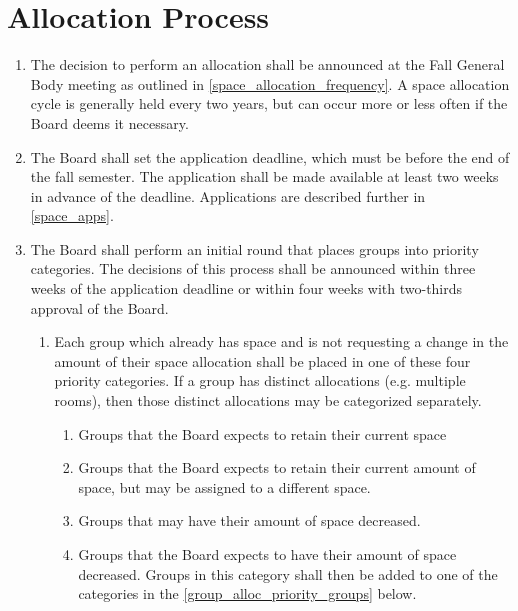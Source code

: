 \documentclass[12pt]{constitution}
\begin{document}
\section{Allocation Process}
\label{space_apps_process}

\begin{enumerate}
    \item The decision to perform an allocation shall be announced at the Fall General Body meeting
        as outlined in \ref{space_allocation_frequency}.
    A space allocation cycle is generally held every two years, but can occur more or less often if
        the Board deems it necessary.
    
    \item The Board shall set the application deadline, which must be before the end of the fall semester.
    The application shall be made available at least two weeks in advance of the deadline.
    Applications are described further in \ref{space_apps}.

    \item The Board shall perform an initial round that places groups into priority categories.
    The decisions of this process shall be announced within three weeks of the application deadline or
        within four weeks with two-thirds approval of the Board.
    \begin{enumerate}
        \item Each group which already has space and is not requesting a change in the amount
            of their space allocation shall be placed in one of these four priority categories.
        If a group has distinct allocations (e.g. multiple rooms), then those distinct allocations
            may be categorized separately.
        \begin{enumerate}
            \item Groups that the Board expects to retain their current space
            \item Groups that the Board expects to retain their current amount of space, but
                may be assigned to a different space.
            \item Groups that may have their amount of space decreased.
            \item Groups that the Board expects to have their amount of space decreased.
            Groups in this category shall then be added to one of the categories in the
                \ref{group_alloc_priority_groups} below.
        \end{enumerate}


\end{enumerate}
\end{enumerate}
\end{document}
